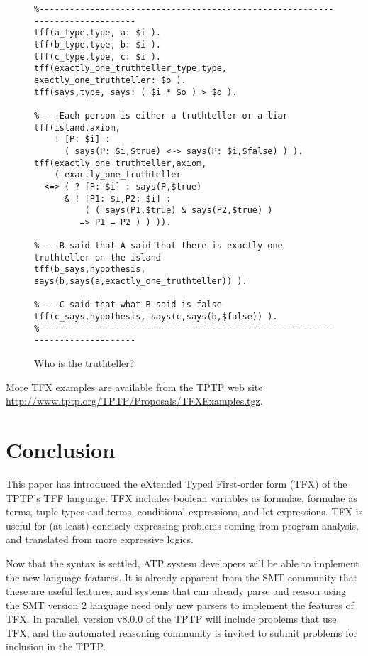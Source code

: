 \documentclass{easychair}
\begin{document}
\begin{figure}[htbp]
\begin{small}
\begin{verbatim}
%------------------------------------------------------------------------------
tff(a_type,type, a: $i ).
tff(b_type,type, b: $i ).
tff(c_type,type, c: $i ).
tff(exactly_one_truthteller_type,type, exactly_one_truthteller: $o ).
tff(says,type, says: ( $i * $o ) > $o ).

%----Each person is either a truthteller or a liar
tff(island,axiom,
    ! [P: $i] :
      ( says(P: $i,$true) <~> says(P: $i,$false) ) ).
tff(exactly_one_truthteller,axiom,
    ( exactly_one_truthteller
  <=> ( ? [P: $i] : says(P,$true)
      & ! [P1: $i,P2: $i] :
          ( ( says(P1,$true) & says(P2,$true) )
         => P1 = P2 ) ) )).

%----B said that A said that there is exactly one truthteller on the island
tff(b_says,hypothesis, says(b,says(a,exactly_one_truthteller)) ).

%----C said that what B said is false
tff(c_says,hypothesis, says(c,says(b,$false)) ).
%------------------------------------------------------------------------------
\end{verbatim}
\end{small}
\caption{Who is the truthteller?}
\label{Truthteller}
\end{figure}

More TFX examples are available from the TPTP web site 
\url{http://www.tptp.org/TPTP/Proposals/TFXExamples.tgz}.

\section{Conclusion}
\label{Conclusion}

This paper has introduced the eXtended Typed First-order form (TFX) of the
TPTP's TFF language.
TFX includes boolean variables as formulae, formulae as terms, tuple types and
terms, conditional expressions, and let expressions.
TFX is useful for (at least) concisely expressing problems coming from 
program analysis, and translated from more expressive logics.

Now that the syntax is settled, ATP system developers will be able to
implement the new language features.
It is already apparent from the SMT community that these are useful features,
and systems that can already parse and reason using the SMT version 2 language 
need only new parsers to implement the features of TFX.
In parallel, version v8.0.0 of the TPTP will include problems that use TFX,
and the automated reasoning community is invited to submit problems for
inclusion in the TPTP.
\end{document}
